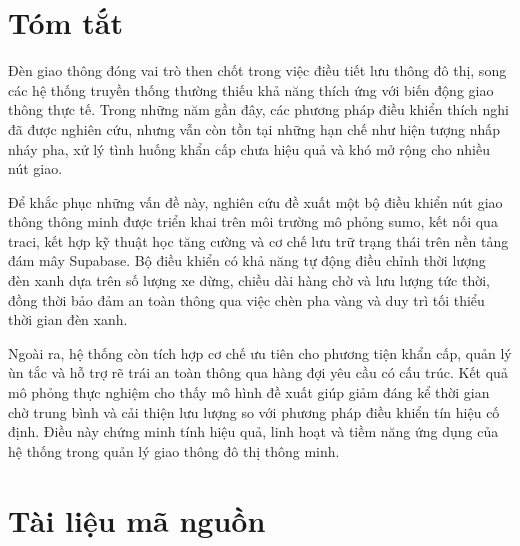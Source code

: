 \chapter*{Tóm tắt}
Đèn giao thông đóng vai trò then chốt trong việc điều tiết lưu thông đô thị, song các hệ thống truyền thống thường thiếu khả năng thích ứng với biến động giao thông thực tế. Trong những năm gần đây, các phương pháp điều khiển thích nghi đã được nghiên cứu, nhưng vẫn còn tồn tại những hạn chế như hiện tượng nhấp nháy pha, xử lý tình huống khẩn cấp chưa hiệu quả và khó mở rộng cho nhiều nút giao.

Để khắc phục những vấn đề này, nghiên cứu đề xuất một bộ điều khiển nút giao thông thông minh được triển khai trên môi trường mô phỏng \gls{sumo}, kết nối qua \gls{traci}, kết hợp kỹ thuật học tăng cường và cơ chế lưu trữ trạng thái trên nền tảng đám mây Supabase. Bộ điều khiển có khả năng tự động điều chỉnh thời lượng đèn xanh dựa trên số lượng xe dừng, chiều dài hàng chờ và lưu lượng tức thời, đồng thời bảo đảm an toàn thông qua việc chèn pha vàng và duy trì tối thiểu thời gian đèn xanh.

Ngoài ra, hệ thống còn tích hợp cơ chế ưu tiên cho phương tiện khẩn cấp, quản lý ùn tắc và hỗ trợ rẽ trái an toàn thông qua hàng đợi yêu cầu có cấu trúc. Kết quả mô phỏng thực nghiệm cho thấy mô hình đề xuất giúp giảm đáng kể thời gian chờ trung bình và cải thiện lưu lượng so với phương pháp điều khiển tín hiệu cố định. Điều này chứng minh tính hiệu quả, linh hoạt và tiềm năng ứng dụng của hệ thống trong quản lý giao thông đô thị thông minh.

\clearpage
{}\appendix
\chapter{Tài liệu mã nguồn}
% 
